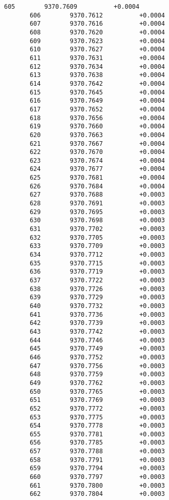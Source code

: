 \documentclass[11pt]{article}
\begin{document}
\begin{Verbatim}[commandchars=\\\{\}]
       605        9370.7609          +0.0004
       606        9370.7612          +0.0004
       607        9370.7616          +0.0004
       608        9370.7620          +0.0004
       609        9370.7623          +0.0004
       610        9370.7627          +0.0004
       611        9370.7631          +0.0004
       612        9370.7634          +0.0004
       613        9370.7638          +0.0004
       614        9370.7642          +0.0004
       615        9370.7645          +0.0004
       616        9370.7649          +0.0004
       617        9370.7652          +0.0004
       618        9370.7656          +0.0004
       619        9370.7660          +0.0004
       620        9370.7663          +0.0004
       621        9370.7667          +0.0004
       622        9370.7670          +0.0004
       623        9370.7674          +0.0004
       624        9370.7677          +0.0004
       625        9370.7681          +0.0004
       626        9370.7684          +0.0004
       627        9370.7688          +0.0003
       628        9370.7691          +0.0003
       629        9370.7695          +0.0003
       630        9370.7698          +0.0003
       631        9370.7702          +0.0003
       632        9370.7705          +0.0003
       633        9370.7709          +0.0003
       634        9370.7712          +0.0003
       635        9370.7715          +0.0003
       636        9370.7719          +0.0003
       637        9370.7722          +0.0003
       638        9370.7726          +0.0003
       639        9370.7729          +0.0003
       640        9370.7732          +0.0003
       641        9370.7736          +0.0003
       642        9370.7739          +0.0003
       643        9370.7742          +0.0003
       644        9370.7746          +0.0003
       645        9370.7749          +0.0003
       646        9370.7752          +0.0003
       647        9370.7756          +0.0003
       648        9370.7759          +0.0003
       649        9370.7762          +0.0003
       650        9370.7765          +0.0003
       651        9370.7769          +0.0003
       652        9370.7772          +0.0003
       653        9370.7775          +0.0003
       654        9370.7778          +0.0003
       655        9370.7781          +0.0003
       656        9370.7785          +0.0003
       657        9370.7788          +0.0003
       658        9370.7791          +0.0003
       659        9370.7794          +0.0003
       660        9370.7797          +0.0003
       661        9370.7800          +0.0003
       662        9370.7804          +0.0003

\end{Verbatim}
\end{document}
